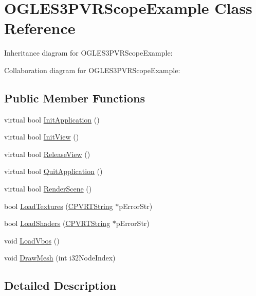 \hypertarget{class_o_g_l_e_s3_p_v_r_scope_example}{\section{O\+G\+L\+E\+S3\+P\+V\+R\+Scope\+Example Class Reference}
\label{class_o_g_l_e_s3_p_v_r_scope_example}
}


Inheritance diagram for O\+G\+L\+E\+S3\+P\+V\+R\+Scope\+Example\+:


Collaboration diagram for O\+G\+L\+E\+S3\+P\+V\+R\+Scope\+Example\+:
\subsection*{Public Member Functions}
\begin{DoxyCompactItemize}
\item 
virtual bool \hyperlink{class_o_g_l_e_s3_p_v_r_scope_example_a233442442db88683953dd2cf218f2692}{Init\+Application} ()
\item 
virtual bool \hyperlink{class_o_g_l_e_s3_p_v_r_scope_example_a3bdccd32f480d84caf3219ddf06ba187}{Init\+View} ()
\item 
virtual bool \hyperlink{class_o_g_l_e_s3_p_v_r_scope_example_a3a812a48eb4a1c16988f730d7165e9f4}{Release\+View} ()
\item 
virtual bool \hyperlink{class_o_g_l_e_s3_p_v_r_scope_example_a7b8e169e290b2390489dddd4955312f0}{Quit\+Application} ()
\item 
virtual bool \hyperlink{class_o_g_l_e_s3_p_v_r_scope_example_ab2b8aafc3cb20c8036ffe5f18f4c7c65}{Render\+Scene} ()
\item 
bool \hyperlink{class_o_g_l_e_s3_p_v_r_scope_example_a3cb936760c472086f8ea4658413bc012}{Load\+Textures} (\hyperlink{class_c_p_v_r_t_string}{C\+P\+V\+R\+T\+String} $\ast$p\+Error\+Str)
\item 
bool \hyperlink{class_o_g_l_e_s3_p_v_r_scope_example_a5b5c9fa29ac54ea19b8ac0ef421a9b29}{Load\+Shaders} (\hyperlink{class_c_p_v_r_t_string}{C\+P\+V\+R\+T\+String} $\ast$p\+Error\+Str)
\item 
void \hyperlink{class_o_g_l_e_s3_p_v_r_scope_example_a85d5028b96279aa624dfc480b90dbd1e}{Load\+Vbos} ()
\item 
void \hyperlink{class_o_g_l_e_s3_p_v_r_scope_example_ae61bbdd9627aaa0e6537e2b2de270079}{Draw\+Mesh} (int i32\+Node\+Index)
\end{DoxyCompactItemize}


\subsection{Detailed Description}


